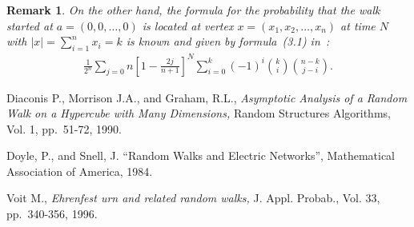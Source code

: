 \documentclass[12pt]{article}
\newtheorem{remark}{Remark}
\begin{document}
\begin{remark}
On the other hand, the formula for the probability that the walk
started at $a=(0,0,\dots,0)$ is located at vertex
$x=(x_1,x_2,\dots,x_n)$ at time $N$ with $|x|=\sum_{i=1}^n x_i=k$
is known and given by formula~(3.1) in~\cite{Diac}:
\begin{eqnarray*}
\frac 1{2^n} \sum_{j=0}{n} \left[1- \frac{2j}{n+1}\right]^N
\sum_{i=0}^{k}(-1)^i {k \choose i}{n-k\choose j-i}.
\end{eqnarray*}
\end{remark}

\begin{thebibliography}{9}

      {\sc Diaconis P.},  {\sc Morrison J.A.}, and {\sc Graham, R.L.,}
    {\em Asymptotic Analysis of a Random Walk on a Hypercube with Many Dimensions,}
    Random Structures Algorithms, Vol. 1, pp.~51-72, 1990.

         {\sc Doyle, P., and Snell, J.}
         ``Random Walks and Electric Networks'',      Mathematical Association of America, 1984.

      {\sc Voit M.},
    {\em Ehrenfest urn and related random walks,}
    J. Appl. Probab., Vol. 33, pp.~340-356, 1996.

\end{thebibliography}
\end{document}

